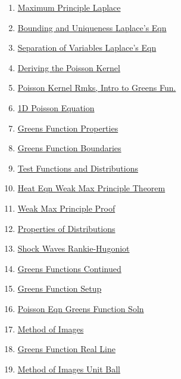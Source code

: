 \documentclass[11pt]{article}
\begin{document}
\begin{multicols}{2}
\begin{enumerate}
		\item  \href{https://mp.weixin.qq.com/s/Wa4JcYNMezl90yfvq76phA}{Maximum Principle Laplace} %
		\item  \href{https://mp.weixin.qq.com/s/oKOM-LA83ycgGzDWVfPPwg}{Bounding and Uniqueness Laplace's Eqn} %
		\item  \href{https://mp.weixin.qq.com/s/--EvsfBO00--g17Z-RXBGQ}{Separation of Variables Laplace's Eqn} %
		\item  \href{https://mp.weixin.qq.com/s/xK9k8ZAJYeztTiuRoIEdCw}{Deriving the Poisson Kernel} %
		\item  \href{https://mp.weixin.qq.com/s/dZ0XM3KZGK5cIsHQTfZyfg}{Poisson Kernel Rmks, Intro to Greens Fun.} %
		\item  \href{https://mp.weixin.qq.com/s/E7LI_qllrslHlrxU47pHUw}{1D Poisson Equation} %
		\item  \href{https://mp.weixin.qq.com/s/ifF7lx4VgchfeBEM0qjfpA}{Greens Function Properties} %
		\item  \href{https://mp.weixin.qq.com/s/pa35iu2mnXzp5X8VwIDfUg}{Greens Function Boundaries} %
		\item  \href{https://mp.weixin.qq.com/s/zcLITGzvR2aQ8YsGK2Y4jg}{Test Functions and Distributions} %
		\item  \href{https://mp.weixin.qq.com/s/B6JpVEefOJNq0J7AZx3_Vw}{Heat Eqn Weak Max Principle Theorem} %
		\item  \href{https://mp.weixin.qq.com/s/DloRZpayKaR7HYsgHAKXfA}{Weak Max Principle Proof} %
		\item  \href{https://mp.weixin.qq.com/s/979jD-uHpxXya8rrkhpktw}{Properties of Distributions} %
		\item  \href{https://mp.weixin.qq.com/s/mKXjGl7ewGKS7aUWY1hjgg}{Shock Waves Rankie-Hugoniot} %
		\item  \href{https://mp.weixin.qq.com/s/m10oVq0fWINldaTpd-xOag}{Greens Functions Continued} %
		\item  \href{https://mp.weixin.qq.com/s/Ha_z5hPsNpa8kvJh-i7bWQ}{Greens Function Setup} %
		\item  \href{https://mp.weixin.qq.com/s/MoUbSkouWbanKgxoxRfhdg}{Poisson Eqn Greens Function Soln} %
		\item  \href{https://mp.weixin.qq.com/s/yjkVJ75N8xOszXwJhOD1_w}{Method of Images}	%
		\item  \href{https://mp.weixin.qq.com/s/sPM5c_0Pr63lB1FBToFn4g}{Greens Function Real Line}	%
		\item  \href{https://mp.weixin.qq.com/s/9iA2qlXBmbkBEUcvEVq88g}{Method of Images  Unit Ball}	%

\end{enumerate}
\end{multicols}
\end{document}
